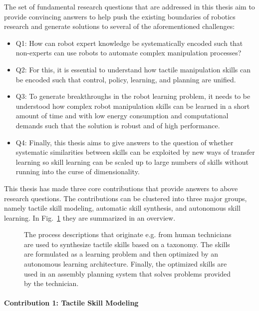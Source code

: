 The set of fundamental research questions that are addressed in this thesis aim to provide convincing answers to help push the existing boundaries of robotics research and generate solutions to several of the aforementioned challenges:
\begin{itemize}
    \item Q1: How can robot expert knowledge be systematically encoded such that non-experts can use robots to automate complex manipulation processes?
    \item Q2: For this, it is essential to understand how tactile manipulation skills can be encoded such that control, policy, learning, and planning are unified.
    \item Q3: To generate breakthroughs in the robot learning problem, it needs to be understood how complex robot manipulation skills can be learned in a short amount of time and with low energy consumption and computational demands such that the solution is robust and of high performance.
    \item Q4: Finally, this thesis aims to give answers to the question of whether systematic similarities between skills can be exploited by new ways of transfer learning so skill learning can be scaled up to large numbers of skills without running into the curse of dimensionality.
\end{itemize}

This thesis has made three core contributions that provide answers to above research questions.
The contributions can be clustered into three major groups, namely tactile skill modeling, automatic skill synthesis, and autonomous skill learning.
In Fig.~\ref{fig:introduction:title} they are summarized in an overview.

\begin{figure}[ht!]
    \centering
    
    \caption{The process descriptions that originate e.g. from human technicians are used to synthesize tactile skills based on a taxonomy. The skills are formulated as a learning problem and then optimized by an autonomous learning architecture. Finally, the optimized skills are used in an assembly planning system that solves problems provided by the technician.}
    \label{fig:introduction:title}
\end{figure}

\paragraph{Contribution 1: Tactile Skill Modeling}

